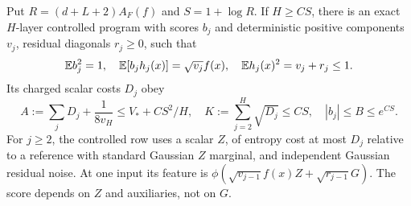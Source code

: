 \begin{lemma}\label{ac-program}
Put $R=(d+L+2)A_F(f)$ and $S=1+\log R$. If $H\ge CS$, there is
an exact $H$-layer controlled program with scores $b_j$ and deterministic
positive components $v_j$, residual diagonals $r_j\ge0$, such that
\[
 \mathbb E b_j^2=1,\quad \mathbb E[b_jh_j(x)]=\sqrt{v_j}f(x),\quad
 \mathbb E h_j(x)^2=v_j+r_j\le1.
\]
Its charged scalar costs $D_j$ obey
\begin{equation}\label{ac-program-bounds}
 A:=\sum_jD_j+\frac1{8v_H}\le V_*+C S^2/H,
 \quad K:=\sum_{j=2}^H\sqrt{D_j}\le CS,
 \quad |b_j|\le B\le e^{CS}.
\end{equation}
For $j\ge2$, the controlled row uses a scalar $Z$, of entropy cost
at most $D_j$ relative to a reference with standard Gaussian $Z$
marginal, and independent Gaussian residual noise. At one input its
feature is
$\phi(\sqrt{v_{j-1}}f(x)Z+\sqrt{r_{j-1}}G)$.
The score depends on $Z$ and auxiliaries, not on $G$.
\end{lemma}
